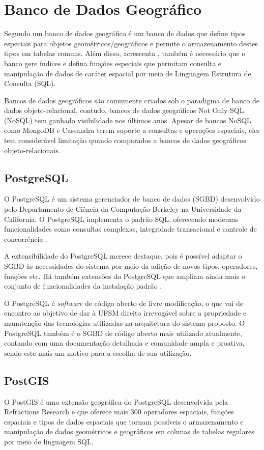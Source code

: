 \documentclass[oneside,openright,12pt]{ufsm_2015} %
\begin{document}
\section{Banco de Dados Geográfico}
Segundo  um banco de dados geográfico é um banco de dados que define tipos especiais para objetos geométricos/geográficos e permite o armazenamento destes tipos em tabelas comuns. 
Além disso, acrescenta , também é necessário que o banco gere índices e defina funções especiais que permitam consulta e manipulação de dados de caráter espacial por meio de Linguagem Estrutura de Consulta (SQL).

Bancos de dados geográficos são comumente criados sob o paradigma de banco de dados objeto-relacional, contudo, bancos de dados geográficos Not Only SQL (NoSQL) tem ganhado visibilidade nos últimos anos. 
Apesar de bancos NoSQL como MongoDB e Cassandra terem suporte a consultas e operações espaciais, eles tem considerável limitação quando comparados a bancos de dados geográficos objeto-relacionais.

\subsection{PostgreSQL}
O PostgreSQL é um  sistema gerenciador de banco de dados (SGBD) desenvolvido pelo Departamento de Ciência da Computação Berkeley na Universidade da California. 
O PostgreSQL implementa  o padrão SQL, oferecendo modernas funcionalidades como consultas complexas, integridade transacional e controle de concorrência \cite{postgre}.

A extensibilidade do PostgreSQL merece destaque, pois é possível adaptar o SGBD às necessidades do sistema por meio da adição de novos tipos, operadores, funções etc. 
Há também extensões do PostgreSQL que ampliam ainda mais o conjunto de funcionalidades da instalação padrão \cite{obe}.

O PostgreSQL é \textit{software} de código aberto de livre modificação, o que vai de encontro ao objetivo de dar à UFSM direito irrevogável sobre a propriedade e manutenção das tecnologias utilizadas na arquitetura do sistema proposto. 
O PostgreSQL também é o SGBD de código aberto mais utilizado atualmente, contando com uma documentação detalhada e comunidade ampla e proativa, sendo este mais um motivo para a escolha de sua utilização.

\subsection{PostGIS}
O PostGIS é uma extensão geográfica do PostgreSQL desenvolvida pela Refractions Research e que oferece mais 300 operadores espaciais, funções espaciais e tipos de dados espaciais que tornam possíveis o armazenamento e manipulação de dados geométricos e geográficos em colunas de tabelas regulares por meio de linguagem SQL.
\end{document}
